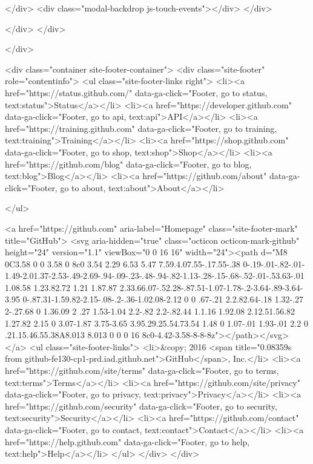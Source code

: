   </div>
  <div class="modal-backdrop js-touch-events"></div>
</div>


    </div>
  </div>

    </div>

        <div class="container site-footer-container">
  <div class="site-footer" role="contentinfo">
    <ul class="site-footer-links right">
        <li><a href="https://status.github.com/" data-ga-click="Footer, go to status, text:status">Status</a></li>
      <li><a href="https://developer.github.com" data-ga-click="Footer, go to api, text:api">API</a></li>
      <li><a href="https://training.github.com" data-ga-click="Footer, go to training, text:training">Training</a></li>
      <li><a href="https://shop.github.com" data-ga-click="Footer, go to shop, text:shop">Shop</a></li>
        <li><a href="https://github.com/blog" data-ga-click="Footer, go to blog, text:blog">Blog</a></li>
        <li><a href="https://github.com/about" data-ga-click="Footer, go to about, text:about">About</a></li>

    </ul>

    <a href="https://github.com" aria-label="Homepage" class="site-footer-mark" title="GitHub">
      <svg aria-hidden="true" class="octicon octicon-mark-github" height="24" version="1.1" viewBox="0 0 16 16" width="24"><path d="M8 0C3.58 0 0 3.58 0 8c0 3.54 2.29 6.53 5.47 7.59.4.07.55-.17.55-.38 0-.19-.01-.82-.01-1.49-2.01.37-2.53-.49-2.69-.94-.09-.23-.48-.94-.82-1.13-.28-.15-.68-.52-.01-.53.63-.01 1.08.58 1.23.82.72 1.21 1.87.87 2.33.66.07-.52.28-.87.51-1.07-1.78-.2-3.64-.89-3.64-3.95 0-.87.31-1.59.82-2.15-.08-.2-.36-1.02.08-2.12 0 0 .67-.21 2.2.82.64-.18 1.32-.27 2-.27.68 0 1.36.09 2 .27 1.53-1.04 2.2-.82 2.2-.82.44 1.1.16 1.92.08 2.12.51.56.82 1.27.82 2.15 0 3.07-1.87 3.75-3.65 3.95.29.25.54.73.54 1.48 0 1.07-.01 1.93-.01 2.2 0 .21.15.46.55.38A8.013 8.013 0 0 0 16 8c0-4.42-3.58-8-8-8z"></path></svg>
</a>
    <ul class="site-footer-links">
      <li>&copy; 2016 <span title="0.08359s from github-fe130-cp1-prd.iad.github.net">GitHub</span>, Inc.</li>
        <li><a href="https://github.com/site/terms" data-ga-click="Footer, go to terms, text:terms">Terms</a></li>
        <li><a href="https://github.com/site/privacy" data-ga-click="Footer, go to privacy, text:privacy">Privacy</a></li>
        <li><a href="https://github.com/security" data-ga-click="Footer, go to security, text:security">Security</a></li>
        <li><a href="https://github.com/contact" data-ga-click="Footer, go to contact, text:contact">Contact</a></li>
        <li><a href="https://help.github.com" data-ga-click="Footer, go to help, text:help">Help</a></li>
    </ul>
  </div>
</div>



